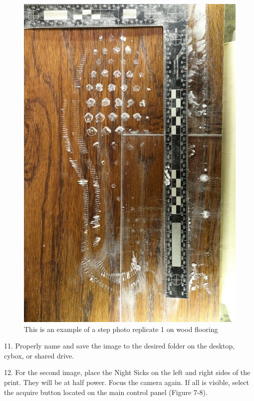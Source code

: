 \begin{figure}[!htp]
\centering
\includegraphics[scale=1.3]{Wood1.png}
\caption{This is an example of a step photo replicate 1 on wood flooring }
\label{Figure 5}
\end{figure}

\newpage

11. Properly name and save the image to the desired folder on the desktop, cybox, or shared drive.

12. For the second image, place the Night Sicks on the left and right sides of the print. They will be at half power. Focus the camera again. If all is visible, select the acquire button located on the main control panel (Figure 7-8).

